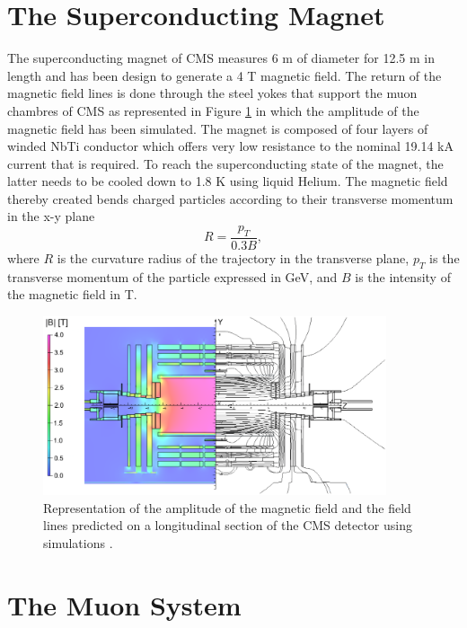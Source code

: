   \section{The Superconducting Magnet}

    The superconducting magnet of CMS measures 6 m of diameter for 12.5 m in length and has been design to generate a 4 T magnetic field. The return of the magnetic field lines is done through the steel yokes that support the muon chambres of CMS as represented in Figure  \ref{fig:I-3-cms-magnet} in which the amplitude of the magnetic field has been simulated. The magnet is composed of four layers of winded NbTi conductor which offers very low resistance to the nominal 19.14 kA current that is required. To reach the superconducting state of the magnet, the latter needs to be cooled down to 1.8 K using liquid Helium. The magnetic field thereby created bends charged particles according to their transverse momentum in the x-y plane
    \begin{equation}
      R = \frac{p_T}{0.3 B} ,
    \end{equation}
    where $ R $ is the curvature radius of the trajectory in the transverse plane, $ p_T $ is the transverse momentum of the particle expressed in GeV, and $ B $ is the intensity of the magnetic field in T.

    \begin{figure}[h!]
      \centering
      \includegraphics[width=0.9\textwidth]{img/I-3-cms/magnet.png}
      \caption{Representation of the amplitude of the magnetic field and the field lines predicted on a longitudinal section of the CMS detector using simulations \cite{Chatrchyan:2009si}.}
      \label{fig:I-3-cms-magnet}
    \end{figure}

  \section{The Muon System}

